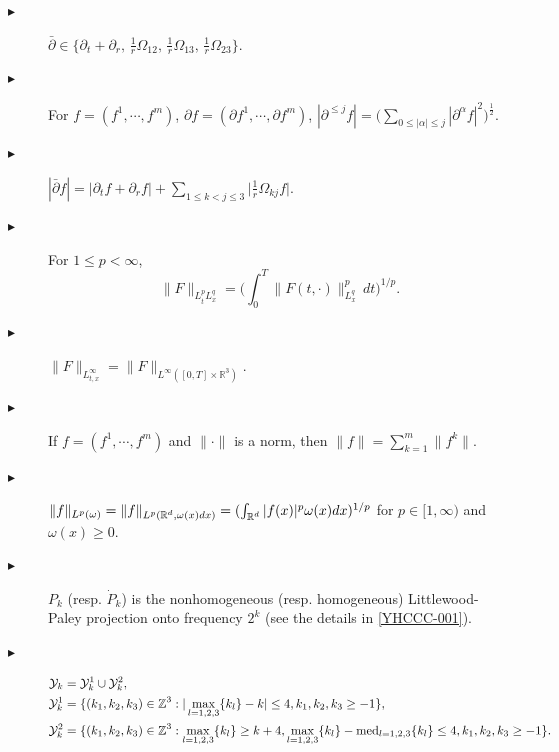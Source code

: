 \documentclass[11pt,twoside]{article}
\def\cY{\mathcal Y}
\def\Z{\mathop{\mathbb Z\kern 0pt}\nolimits}
\def\R{\mathop{\mathbb R\kern 0pt}\nolimits}
\def\ds{\displaystyle}
\def\p{\partial}
\newcommand{\pk}{\dot{P}_k}
\newcommand{\Pk}{P_k}
\theoremstyle{plain}
\theoremstyle{definition}
\theoremstyle{assumption}
\numberwithin{equation}{section}
\begin{document}
\begin{description}
		\item [$\blacktriangleright $]
		$
			\bar\partial
			\in
			\big\{
			\partial_t+\partial_r,\,
			\frac1r\Omega_{12},\,
			\frac1r\Omega_{13},\,
			\frac1r\Omega_{23}
			\big\}.
		$
		
		\item [$\blacktriangleright $]For $f = (f^1,\cdots,f^m)$, $\p f=   (\p f^1,\cdots,\p f^m)$, $\ds|\p^{\le j}f|=\big(\sum_{0\le|\alpha|
			\le j}|\p^\alpha f|^2\big)^\frac12$.
		
		
		\item [$\blacktriangleright $]
		$
			|\bar\partial f|
			=
			|\partial_t f+\partial_r f|
			+\ds\sum_{1\le k<j\le3}
			\big|\frac1r\Omega_{kj}f\big|.
		$
		
		
		\item [$\blacktriangleright $]
		For $1\le p<\infty$,
		\begin{equation*}
			\|F\|_{L^p_tL^q_x}
			=
			\big(
			\int_0^T\|F(t,\cdot)\|_{L^q_x}^p\,dt
			\big)^{1/p}.
		\end{equation*}
		
		\item [$\blacktriangleright $]
		$\|F\|_{L^\infty_{t,x}}=\|F\|_{L^\infty([0,T]\times\mathbb R^3)}$.
		
		\item [$\blacktriangleright $]
		If $f=(f^1,\cdots,f^m)$ and $\|\cdot\|$ is a norm, then
		$\|f\|=\ds\sum_{k=1}^m\|f^k\|$.
		
		\item [$\blacktriangleright $] $\|f\|_{L^p(\omega)}=\|f\|_{L^p(\R^d,\omega(x)dx)} = (\int_{\R^d} |f(x)|^p\omega(x)dx)^{1/p}$ for $p \in [1,\infty)$ and $\omega(x)\ge 0$.
		
		\item [$\blacktriangleright $]$\Pk$ (resp. $\pk$) is the nonhomogeneous (resp. homogeneous) Littlewood-Paley projection onto frequency $2^k$ (see the details in \eqref{YHCCC-001}).
		\item [$\blacktriangleright $] \begin{equation*}
			\begin{split}
				\cY_k&=\cY_k^1\cup\cY_k^2,\\
				\cY_k^1&=\{(k_1,k_2,k_3)\in\Z^3: |\max_{l=1,2,3}\{k_l\}-k|\le4,k_1,k_2,k_3\ge-1\},\\
				\cY_k^2&=\{(k_1,k_2,k_3)\in\Z^3: \max_{l=1,2,3}\{k_l\}\ge k+4,
				\max_{l=1,2,3}\{k_l\}-{\rm med}_{l=1,2,3}\{k_l\}\le4,k_1,k_2,k_3\ge-1\}.
			\end{split}
		\end{equation*}
		

\end{description}
\end{document}
